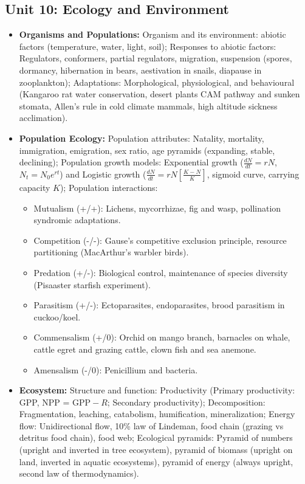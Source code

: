 \documentclass[11pt,a4paper]{article}
\begin{document}
\subsection{Unit 10: Ecology and Environment}
\begin{itemize}
  \item \textbf{Organisms and Populations:} Organism and its environment: abiotic factors (temperature, water, light, soil); Responses to abiotic factors: Regulators, conformers, partial regulators, migration, suspension (spores, dormancy, hibernation in bears, aestivation in snails, diapause in zooplankton); Adaptations: Morphological, physiological, and behavioural (Kangaroo rat water conservation, desert plants CAM pathway and sunken stomata, Allen's rule in cold climate mammals, high altitude sickness acclimation).
  \item \textbf{Population Ecology:} Population attributes: Natality, mortality, immigration, emigration, sex ratio, age pyramids (expanding, stable, declining); Population growth models: Exponential growth ($\frac{dN}{dt} = rN$, $N_t = N_0 e^{rt}$) and Logistic growth ($\frac{dN}{dt} = rN[\frac{K - N}{K}]$, sigmoid curve, carrying capacity $K$); Population interactions:
  \begin{itemize}
    \item Mutualism (+/+): Lichens, mycorrhizae, fig and wasp, pollination syndromic adaptations.
    \item Competition (-/-): Gause's competitive exclusion principle, resource partitioning (MacArthur's warbler birds).
    \item Predation (+/-): Biological control, maintenance of species diversity (Pisaaster starfish experiment).
    \item Parasitism (+/-): Ectoparasites, endoparasites, brood parasitism in cuckoo/koel.
    \item Commensalism (+/0): Orchid on mango branch, barnacles on whale, cattle egret and grazing cattle, clown fish and sea anemone.
    \item Amensalism (-/0): Penicillium and bacteria.
  \end{itemize}
  \item \textbf{Ecosystem:} Structure and function: Productivity (Primary productivity: GPP, NPP = $\text{GPP} - R$; Secondary productivity); Decomposition: Fragmentation, leaching, catabolism, humification, mineralization; Energy flow: Unidirectional flow, 10\% law of Lindeman, food chain (grazing vs detritus food chain), food web; Ecological pyramids: Pyramid of numbers (upright and inverted in tree ecosystem), pyramid of biomass (upright on land, inverted in aquatic ecosystems), pyramid of energy (always upright, second law of thermodynamics).

\end{itemize}
\end{document}
